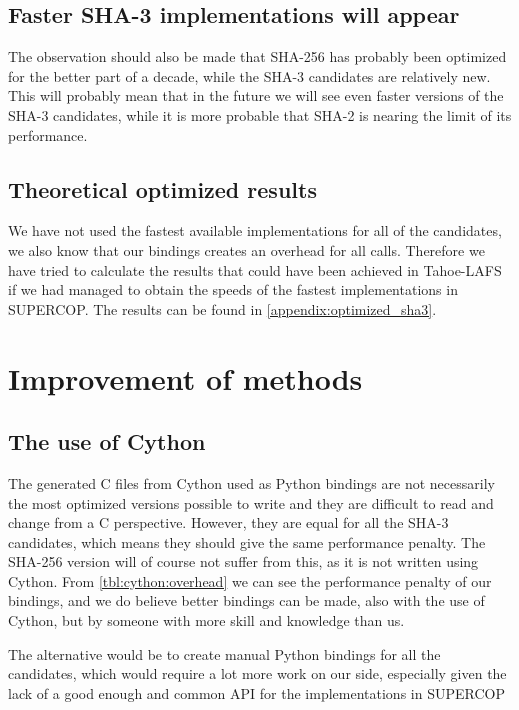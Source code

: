 \documentclass[english,12pt,a4paper]{book}
\begin{document}
\subsection{Faster SHA-3 implementations will appear}

The observation should also be made that \ac{SHA}-256 has probably been
optimized for the better part of a decade, while the \ac{SHA}-3 candidates are
relatively new. This will probably mean that in the future we will see even
faster versions of the \ac{SHA}-3 candidates, while it is more probable that
\ac{SHA}-2 is nearing the limit of its performance.

\subsection{Theoretical optimized results}

We have not used the fastest available implementations for all of the
candidates, we also know that our bindings creates an overhead for all calls.
Therefore we have tried to calculate the results that could have been achieved
in Tahoe-\ac{LAFS} if we had managed to obtain the speeds of the fastest
implementations in \ac{SUPERCOP}. The results can be found in
\autoref{appendix:optimized_sha3}.

\section{Improvement of methods}

\subsection{The use of Cython}

The generated C files from Cython used as Python bindings are not necessarily
the most optimized versions possible to write and they are difficult to read and
change from a C perspective. However, they are equal for all the \ac{SHA}-3
candidates, which means they should give the same performance penalty. The
\ac{SHA}-256 version will of course not suffer from this, as it is not written
using Cython. From \autoref{tbl:cython:overhead} we can see the performance
penalty of our bindings, and we do believe better bindings can be made, also
with the use of Cython, but by someone with more skill and knowledge than us.

The alternative would be to create manual Python bindings for all the
candidates, which would require a lot more work on our side, especially given
the lack of a good enough and common \ac{API} for the implementations in
\ac{SUPERCOP}
\end{document}
